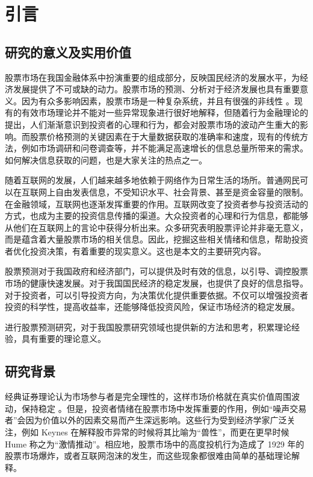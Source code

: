 \chapter{引言}

\section{研究的意义及实用价值}

股票市场在我国金融体系中扮演重要的组成部分，反映国民经济的发展水平，为经济发展提供了不可或缺的动力。股票市场的预测、分析对于经济发展也具有重要意义。因为有众多影响因素，股票市场是一种复杂系统，并且有很强的非线性 \cite{intro:0} 。现有的有效市场理论并不能对一些异常现象进行很好地解释，但随着行为金融理论的提出，人们渐渐意识到投资者的心理和行为，都会对股票市场的波动产生重大的影响。而股票价格预测的关键因素在于大量数据获取的准确率和速度，现有的传统方法，例如市场调研和问卷调查等，并不能满足高速增长的信息总量所带来的需求。如何解决信息获取的问题，也是大家关注的热点之一。

随着互联网的发展，人们越来越多地依赖于网络作为日常生活的场所。普通网民可以在互联网上自由发表信息，不受知识水平、社会背景、甚至是资金容量的限制。在金融领域，互联网也逐渐发挥重要的作用。互联网改变了投资者参与投资活动的方式，也成为主要的投资信息传播的渠道。大众投资者的心理和行为信息，都能够从他们在互联网上的言论中获得分析出来。众多研究表明股票评论并非毫无意义，而是蕴含着大量股票市场的相关信息。因此，挖掘这些相关情绪和信息，帮助投资者优化投资决策，有着重要的现实意义。这也是本文的主要研究内容。

股票预测对于我国政府和经济部门，可以提供及时有效的信息，以引导、调控股票市场的健康快速发展。对于我国国民经济的稳定发展，也提供了良好的信息指导。对于投资者，可以引导投资方向，为决策优化提供重要依据。不仅可以增强投资者投资的科学性，提高收益率，还能够降低投资风险，保证市场经济的稳定发展。

进行股票预测研究，对于我国股票研究领域也提供新的方法和思考，积累理论经验，具有重要的理论意义。

\section{研究背景}

经典证券理论认为市场参与者是完全理性的，这样市场价格就在真实价值周围波动，保持稳定 \cite{intro:1}\cite{intro:2} 。但是，投资者情绪在股票市场中发挥重要的作用，例如``噪声交易者''会因为价值以外的因素交易而产生深远影响。这些行为受到经济学家广泛关注，例如 Keynes \cite{intro:3} 在解释股市异常的时候将其比喻为``兽性''，而更在更早时候 Hume \cite{intro:4} 称之为``激情推动''。相应地，股票市场中的高度投机行为造成了 1929 年的股票市场爆炸，或者互联网泡沫的发生，而这些现象都很难由简单的基础理论解释。


